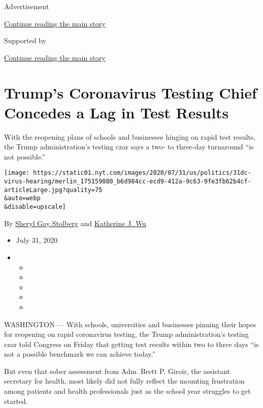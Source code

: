 Advertisement

\protect\hyperlink{after-top}{Continue reading the main story}

Supported by

\protect\hyperlink{after-sponsor}{Continue reading the main story}

\hypertarget{trumps-coronavirus-testing-chief-concedes-a-lag-in-test-results}{%
\section{Trump's Coronavirus Testing Chief Concedes a Lag in Test
Results}\label{trumps-coronavirus-testing-chief-concedes-a-lag-in-test-results}}

With the reopening plans of schools and businesses hinging on rapid test
results, the Trump administration's testing czar says a two- to
three-day turnaround ``is not possible.''

\texttt{[image: https://static01.nyt.com/images/2020/07/31/us/politics/31dc-virus-hearing/merlin\_175159080\_b6d984cc-ecd9-412a-9c63-9fe3fb62b4cf-articleLarge.jpg?quality=75\\\&auto=webp\\\&disable=upscale]}

By \href{https://www.nytimes.com/by/sheryl-gay-stolberg}{Sheryl Gay
Stolberg} and
\href{https://www.nytimes.com/by/katherine-j--wu}{Katherine J. Wu}

\begin{itemize}
\item
  July 31, 2020
\item
  \begin{itemize}
  \item
  \item
  \item
  \item
  \item
  \end{itemize}
\end{itemize}

WASHINGTON --- With schools, universities and businesses pinning their
hopes for reopening on rapid coronavirus testing, the Trump
administration's testing czar told Congress on Friday that getting test
results within two to three days ``is not a possible benchmark we can
achieve today.''

But even that sober assessment from Adm. Brett P. Giroir, the assistant
secretary for health, most likely did not fully reflect the mounting
frustration among patients and health professionals just as the school
year struggles to get started.

